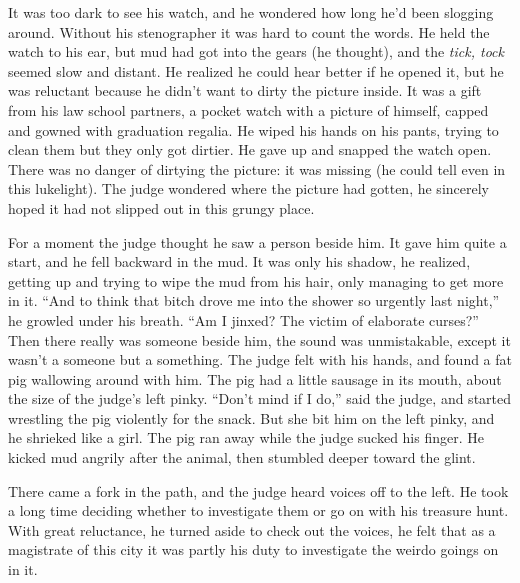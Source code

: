 \documentclass[oneside]{book}
\begin{document}
It was too dark to see his watch, and he wondered how long he'd been slogging around.
Without his stenographer it was hard to count the words.  He held the
watch to his ear, but mud had got into the gears (he thought), and the \emph{tick, tock}
seemed slow and distant.  He realized he could hear better if he opened it, but he
was reluctant because he didn't want to dirty the picture inside.  It was a gift from
his law school partners, a pocket watch with a picture of himself, capped and gowned with
graduation regalia.  He wiped his hands on his pants, trying to clean them but
they only got dirtier.
He gave up and snapped
the watch open.  There was no danger of dirtying the picture: it was missing (he could tell
even in this lukelight).  The judge wondered where the picture had gotten, he sincerely
hoped it had not slipped out in this grungy place.

For a moment the judge thought he saw a person beside him.  It gave him quite a start,
and he fell backward in the mud.  It was only his shadow, he realized, getting up and
trying to wipe the mud from his hair, only managing to get more in it.  ``And to think
that bitch drove me into the shower so urgently last night,'' he growled under his
breath.  ``Am I jinxed?  The victim of elaborate curses?''  Then there really was
someone beside him, the sound was unmistakable, except it wasn't a someone but a something.
The judge felt with his hands, and found a fat pig wallowing around with him.
The pig had a little sausage in its mouth, about the size of the judge's left pinky.
``Don't mind if I do,'' said the judge, and started wrestling the pig violently for the snack.
But she bit him on the left pinky, and he shrieked like a girl.
The pig ran away while the judge sucked his finger.
He kicked mud angrily after the animal, then stumbled deeper toward the glint.


There came a fork in the path, and the judge heard voices off to the left.
He took a long time deciding whether to investigate them or go on with his treasure hunt.
With great reluctance, he turned aside to check out the voices, he felt that as a
magistrate of this city it was partly his duty to investigate the weirdo goings on
in it.
\end{document}
